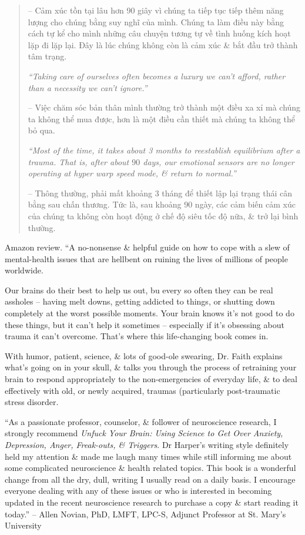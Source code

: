 \documentclass{article}
\begin{document}
\begin{enumerate}
\begin{quotation}
		-- Cảm xúc tồn tại lâu hơn 90 giây vì chúng ta tiếp tục tiếp thêm năng lượng cho chúng bằng suy nghĩ của mình. Chúng ta làm điều này bằng cách tự kể cho mình những câu chuyện tương tự về tình huống kích hoạt lặp đi lặp lại. Đây là lúc chúng không còn là cảm xúc \& bắt đầu trở thành tâm trạng.
		
		{\it``Taking care of {\sc ourselves} often becomes a luxury we can't afford, rather than a necessity we can't ignore.''}
		
		-- Việc chăm sóc {\sc bản thân mình} thường trở thành một điều xa xỉ mà chúng ta không thể mua được, hơn là một điều cần thiết mà chúng ta không thể bỏ qua.
		
		{\it``Most of the time, it takes about 3 months to reestablish equilibrium after a trauma. That is, after about $90$ days, our emotional sensors are no longer operating at hyper warp speed mode, \& return to normal.''}
		
		-- Thông thường, phải mất khoảng 3 tháng để thiết lập lại trạng thái cân bằng sau chấn thương. Tức là, sau khoảng $90$ ngày, các cảm biến cảm xúc của chúng ta không còn hoạt động ở chế độ siêu tốc độ nữa, \& trở lại bình thường.
	\end{quotation}
	{\sf Amazon review.} ``A no-nonsense \& helpful guide on how to cope with a slew of mental-health issues that are hellbent on ruining the lives of millions of people worldwide.
	
	Our brains do their best to help us out, bu every so often they can be real assholes -- having melt downs, getting addicted to things, or shutting down completely at the worst possible moments. Your brain knows it's not good to do these things, but it can't help it sometimes -- especially if it's obsessing about trauma it can't overcome. That's where this life-changing book comes in.
	
	With humor, patient, science, \& lots of good-ole swearing, Dr. Faith explains what's going on in your skull, \& talks you through the process of retraining your brain to respond appropriately to the non-emergencies of everyday life, \& to deal effectively with old, or newly acquired, traumas (particularly post-traumatic stress disorder.
	
	``As a passionate professor, counselor, \& follower of neuroscience research, I strongly recommend {\it Unfuck Your Brain: Using Science to Get Over Anxiety, Depression, Anger, Freak-outs, \& Triggers}. Dr {\sc Harper}'s writing style definitely held my attention \& made me laugh many times while still informing me about some complicated neuroscience \& health related topics. This book is a wonderful change from all the dry, dull, writing I usually read on a daily basis. I encourage everyone dealing with any of these issues or who is interested in becoming updated in the recent neuroscience research to purchase a copy \& start reading it today.'' -- {\sc Allen Novian}, PhD, LMFT, LPC-S, Adjunct Professor at St. Mary's University
	

\end{enumerate}
\end{document}

